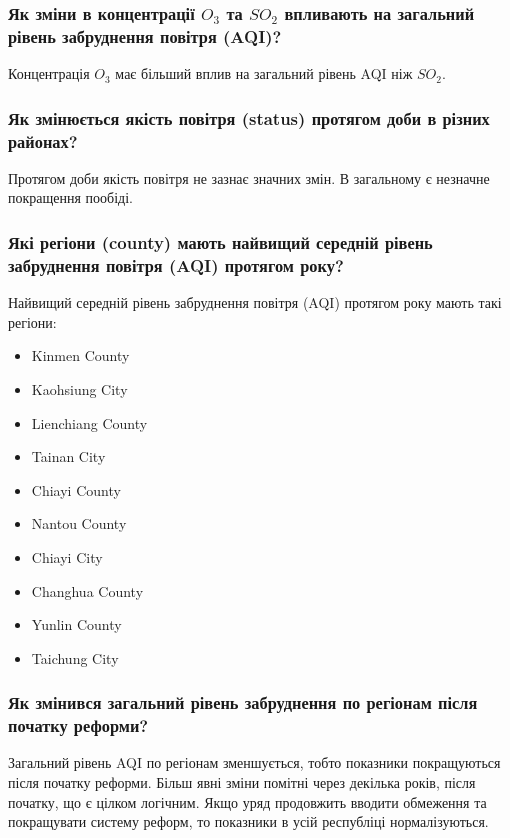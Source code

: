 \documentclass{beamer}
\begin{document}
\begin{frame}
  \frametitle{Як зміни в концентрації  $O_3$  та $SO_2$ впливають на загальний рівень забруднення повітря (AQI)?}

  Концентрація $O_3$ має більший вплив на загальний рівень AQI ніж $SO_2$.
\end{frame}

\begin{frame}
  \frametitle{Як змінюється якість повітря (status) протягом доби в різних районах?}

  Протягом доби якість повітря не зазнає значних змін. В загальному є незначне покращення пообіді.

\end{frame}

\begin{frame}
  \frametitle{Які регіони (county) мають найвищий середній рівень забруднення повітря (AQI) протягом року?}

  Найвищий середній рівень забруднення повітря (AQI) протягом року мають такі регіони: 
  \begin{multicols}{2}
    \begin{itemize}
        \item Kinmen County
        \item Kaohsiung City
        \item Lienchiang County
        \item Tainan City
        \item Chiayi County
        \item Nantou County
        \item Chiayi City
        \item Changhua County
        \item Yunlin County
        \item Taichung City
    \end{itemize}
    \end{multicols} 

\end{frame}

\begin{frame}
  \frametitle{Як змінився загальний рівень забруднення по регіонам після початку реформи?}

  Загальний рівень AQI по регіонам зменшується, тобто показники покращуються після початку реформи.
  Більш явні зміни помітні через декілька років, після початку, що є цілком логічним. 
  Якщо уряд продовжить вводити обмеження та покращувати систему реформ, то показники в усій республіці нормалізуються. 

\end{frame}
\end{document}
